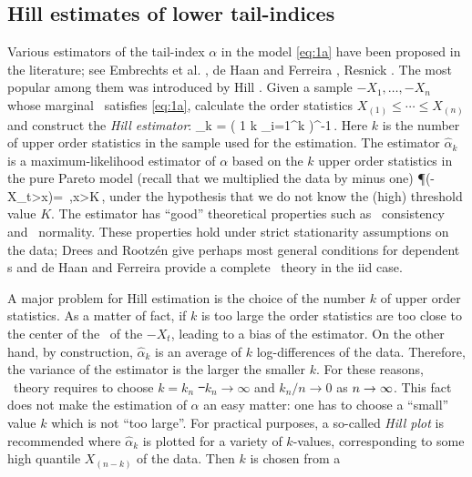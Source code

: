 \subsection{Hill estimates of lower tail-indices}\label{sec:Hill}
Various estimators of the tail-index $\alpha$  in the model
\eqref{eq:1a} have been proposed in the literature;
see Embrechts et al. \cite{embrechts:klueppelberg:mikosch:1997}, de
Haan and Ferreira \cite{haan:ferreira:2006}, Resnick
\cite{resnick:2007}. The most popular among them was introduced  by
Hill \cite{hill1975simple}.
Given a sample $-X_1,\ldots,-X_n$ whose marginal \ds\ satisfies  \eqref{eq:1a}, calculate
the order statistics $X_{(1)}\le \cdots\le X_{(n)}$  and construct the
{\em Hill estimator}:
\beao%
  \hat \alpha_k = \Big(
    {1 \over k} \sum_{i=1}^k 
    \Big)^{-1}\,.
\eeao
Here $k$  is the number of upper order statistics in the sample used
for the estimation. The estimator $\hat \alpha_k$ is 
a maximum-likelihood estimator of $\alpha$ based on the $k$ upper
order statistics in the pure Pareto model (recall that 
we multiplied the data by minus one)
\beam\label{eq:3}
\P(-X_t>x)= \,,\qquad x>K\,,
\eeam
under the hypothesis that we do not know the (high) threshold value
$K$. The estimator has ``good'' theoretical properties such as 
\asy\ consistency and \asy\ normality. These properties hold under
strict stationarity assumptions on the data; Drees and Rootz\'en 
\cite{drees:rootzen:2010} give perhaps most general conditions for
dependent \seq s and de Haan and Ferreira \cite{haan:ferreira:2006} provide
a complete \asy\ theory in the iid case.
\par
A major problem for Hill estimation is the choice of the number $k$ of
upper order statistics. As  a matter of fact,
if $k$ is too large the order statistics are too close to the center
of the \ds\ of the $-X_t$, leading to a bias
of the estimator. On the other hand, by construction, $\hat \alpha_k$ is an average of $k$ log-differences of the 
data. Therefore, the variance of the estimator is the larger the
smaller $k$. For these reasons, \asy\ theory requires 
to choose $k=k_n$ \st\ $k_n\to\infty$ and $k_n/n\to 0$ as $n\to\infty$. This
fact does not make the estimation of $\alpha$ an  
easy matter: one has to choose a ``small'' value $k$ which is not
``too large''. For practical purposes,
a so-called {\em Hill plot} is recommended where $\hat \alpha_k$ is
plotted for a variety of $k$-values, corresponding to
some high  quantile $X_{(n-k)}$ of the data. Then $k$ is chosen from a
